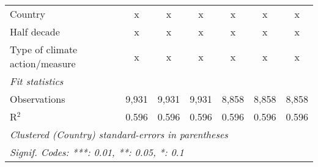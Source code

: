 \begin{tabular}{lcccccc}
   Country                                                 & x            & x             & x             & x            & x             & x\\  
   Half decade                                             & x            & x             & x             & x            & x             & x\\  
   Type of climate action/measure                          & x            & x             & x             & x            & x             & x\\  
   \midrule \emph{Fit statistics}\\
   Observations                                            & 9,931        & 9,931         & 9,931         & 8,858        & 8,858         & 8,858\\  
   R$^2$                                                   & 0.596        & 0.596         & 0.596         & 0.596        & 0.596         & 0.596\\  
   \midrule
   \multicolumn{7}{l}{\emph{Clustered (Country) standard-errors in parentheses}}\\
   \multicolumn{7}{l}{\emph{Signif. Codes: ***: 0.01, **: 0.05, *: 0.1}}\\
\end{tabular}
\par\endgroup


